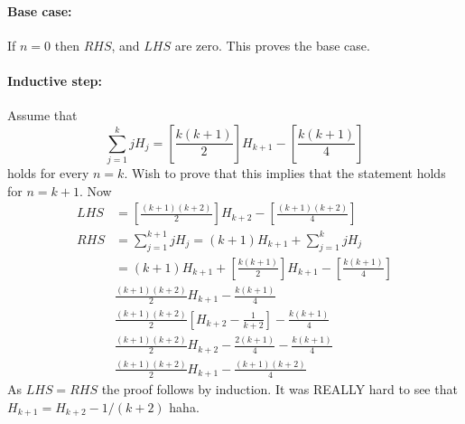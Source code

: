 \documentclass[a4paper, english, 12pt]{article} %
\begin{document}
\begin{answer}
  \paragraph{Base case:} If $n=0$ then $RHS$, and $LHS$ are zero. This proves
  the base case.
  \paragraph{Inductive step:}Assume that
  \begin{equation*}
    \sum_{j=1}^k j H_j
    = \left[ \frac{k(k+1)}{2} \right] H_{k+1} - \left[ \frac{k(k+1)}{4} \right]
  \end{equation*}
  holds for every $n = k$. Wish to prove that this implies that the statement
  holds for $n = k + 1$. Now
  \begin{align*}
    LHS & = \left[ \frac{(k+1)(k+2)}{2} \right] H_{k+2} - \left[ \frac{(k+1)(k+2)}{4} \right]\\
    RHS & = \sum_{j=1}^{k+1} j H_j = (k+1) H_{k+1} + \sum_{j=1}^{k} j H_j \\
        & = (k+1)H_{k+1} + \left[ \frac{k(k+1)}{2} \right] H_{k+1} - \left[ \frac{k(k+1)}{4} \right] \\
        & \frac{(k+1)(k+2)}{2} H_{k+1} - \frac{k(k+1)}{4} \\
        & \frac{(k+1)(k+2)}{2} \left[ H_{k+2} - \frac{1}{k+2} \right] - \frac{k(k+1)}{4} \\
        & \frac{(k+1)(k+2)}{2} H_{k+2} - \frac{2(k+1)}{4} - \frac{k(k+1)}{4} \\
        & \frac{(k+1)(k+2)}{2} H_{k+1} - \frac{(k+1)(k+2)}{4}
  \end{align*}
  As $LHS = RHS$ the proof follows by induction. It was REALLY hard to see that
  $H_{k+1} = H_{k+2} - 1/(k+2)$ haha.
\end{answer}
\end{document}
